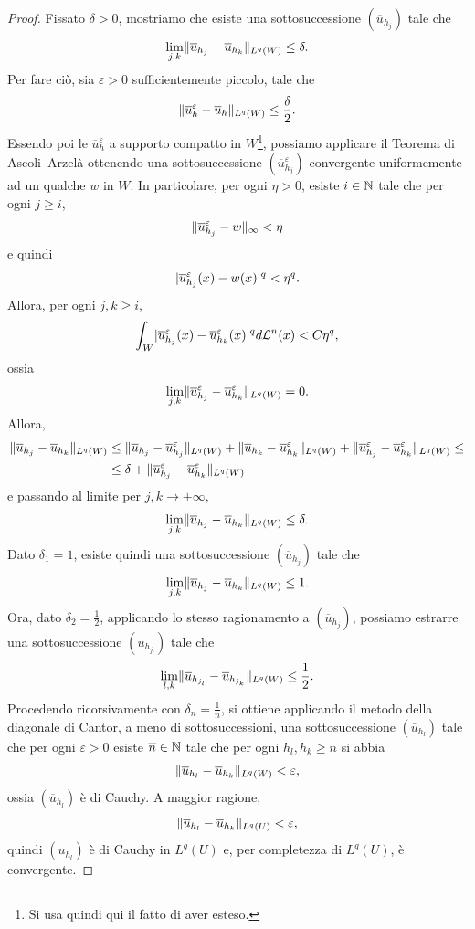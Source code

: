 \begin{proof}
	Fissato $\delta > 0$, mostriamo che esiste una sottosuccessione $(\overline{u}_{h_j})$ tale che 
	\[ \lim\limits_{j,k} \lVert\overline{u}_{h_j}-\overline{u}_{h_k}\rVert_{L^q(W)} \le \delta. \]
	Per fare ciò, sia $\varepsilon >0$ sufficientemente piccolo, tale che 
	\[ \lVert\overline{u}_h^\varepsilon - \overline{u}_h\rVert_{L^q(W)} \le \frac{\delta}{2}. \]
	Essendo poi le $\overline{u}_h^\varepsilon$ a supporto compatto in $W$\footnote{Si usa quindi qui il fatto di aver esteso.}, possiamo applicare il Teorema di Ascoli--Arzelà ottenendo una sottosuccessione $(\overline{u}_{h_j}^\varepsilon)$ convergente uniformemente ad un qualche $w$ in $W$. In particolare, per ogni $\eta > 0$, esiste $i \in \mathbb{N}$ tale che per ogni $j \ge i$, 
	\[ \lVert\overline{u}_{h_j}^\varepsilon - w\rVert_\infty < \eta \]
	e quindi 
	\[  \lvert\overline{u}_{h_j}^\varepsilon(x) - w(x)\rvert^q < \eta^q. \]
	Allora, per ogni $j,k \ge i$,
	\[ \int_W \lvert\overline{u}_{h_j}^\varepsilon(x) - \overline{u}_{h_k}^\varepsilon(x)\rvert^qd\mathcal{L}^n(x) < C\eta^q, \]
	ossia
	\[ \underset{j,k}{\textup{lim}} \lVert\overline{u}_{h_j}^\varepsilon-\overline{u}_{h_k}^\varepsilon\rVert_{L^q(W)} = 0.\]
	Allora, 
	\begin{align*}
		\lVert\overline{u}_{h_j} - \overline{u}_{h_k}\rVert_{L^q(W)} &\le \lVert\overline{u}_{h_j} - \overline{u}_{h_j}^\varepsilon\rVert_{L^q(W)} +\lVert\overline{u}_{h_k} - \overline{u}_{h_k}^\varepsilon\rVert_{L^q(W)} + \lVert\overline{u}_{h_j}^\varepsilon - \overline{u}_{h_k}^\varepsilon\rVert_{L^q(W)} \le \\
		& \le \delta + \lVert\overline{u}_{h_j}^\varepsilon - \overline{u}_{h_k}^\varepsilon\rVert_{L^q(W)}
	\end{align*}
	e passando al limite per $j,k \to +\infty,$
	\[ \lim\limits_{j,k} \lVert\overline{u}_{h_j} - \overline{u}_{h_k}\rVert_{L^q(W)} \le \delta.\]
	Dato $\delta_1 = 1$, esiste quindi una sottosuccessione $(\overline{u}_{h_j})$ tale che 
	\[ \lim\limits_{j,k} \lVert\overline{u}_{h_j} - \overline{u}_{h_k}\rVert_{L^q(W)} \le 1.\]
	Ora, dato $\delta_2 = \frac{1}{2}$, applicando lo stesso ragionamento a $(\overline{u}_{h_j})$, possiamo estrarre una sottosuccessione $(\overline{u}_{h_{j_l}})$ tale che 
	\[ \lim\limits_{l,k} \lVert\overline{u}_{h_{j_l}} - \overline{u}_{h_{j_k}}\rVert_{L^q(W)} \le \frac{1}{2}.\]
	Procedendo ricorsivamente con $\delta_n = \frac{1}{n}$, si ottiene applicando il metodo della diagonale di Cantor, a meno di sottosuccessioni, una sottosuccessione $(\overline{u}_{h_l})$ tale che per ogni $\varepsilon > 0$ esiste $\overline{n} \in \mathbb{N}$ tale che per ogni $h_l,h_k \ge \overline{n}$ si abbia
	\[ \lVert\overline{u}_{h_l}-\overline{u}_{h_k}\rVert_{L^q(W)}<\varepsilon, \]
	ossia $(\overline{u}_{h_l})$ è di Cauchy. A maggior ragione,
	\[ \lVert\overline{u}_{h_l}-\overline{u}_{h_k}\rVert_{L^q(U)}<\varepsilon, \]
	quindi $(u_{h_l})$ è di Cauchy in $L^q(U)$ e, per completezza di $L^q(U)$, è convergente.
\end{proof}

